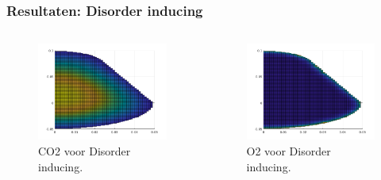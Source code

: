 \documentclass{beamer}
\begin{document}
\begin{frame}
\frametitle{Resultaten: Disorder inducing}
\begin{columns}
\begin{column}{0.48\textwidth}
\begin{figure}
\includegraphics[width = 1\textwidth]{Disorder_inducing_pear_CO2_boven.png}
\caption{CO2 voor Disorder inducing.}
\end{figure}
\end{column}
	
\begin{column}{0.48\textwidth}
\begin{figure}
\includegraphics[width = 1\textwidth]{Disorder_inducing_pear_O2_boven.png}
\caption{O2 voor Disorder inducing.}
\end{figure}
\end{column}
\end{columns}
	
\end{frame}
\end{document}
